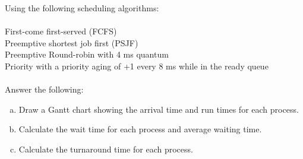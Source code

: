 \documentclass{article}
\begin{document}
Using the following scheduling algorithms:\\
\;\\
First-come first-served (FCFS)\\
Preemptive shortest job first (PSJF)\\
Preemptive Round-robin with 4 ms quantum\\
Priority with a priority aging of +1 every 8 ms while in the ready queue\\
\;\\
Answer the following:\\
\begin{enumerate}[(a)]
  \item Draw a Gantt chart showing the arrival time and run times for each process.
  \item Calculate the wait time for each process and average waiting time.
  \item Calculate the turnaround time for each process.
\end{enumerate}
\end{document}
